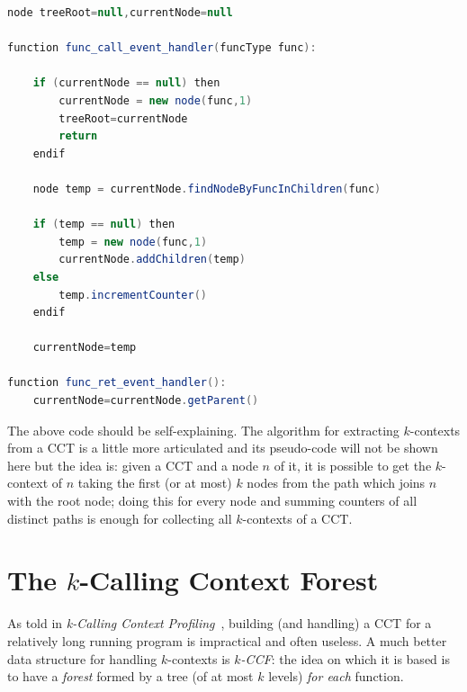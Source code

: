 \documentclass[a4paper,10pt]{report}
\begin{document}
\newpage

\begin{lstlisting}[language=java, label={cct_alg}, caption={An algorithm for building a CCT}, morekeywords={function,then,endif},frame=leftline,framesep=10pt]
node treeRoot=null,currentNode=null

function func_call_event_handler(funcType func):

	if (currentNode == null) then 	
		currentNode = new node(func,1) 
		treeRoot=currentNode
		return
	endif

	node temp = currentNode.findNodeByFuncInChildren(func)

	if (temp == null) then
		temp = new node(func,1)
		currentNode.addChildren(temp)
	else
		temp.incrementCounter()
	endif

	currentNode=temp

function func_ret_event_handler():
	currentNode=currentNode.getParent()

\end{lstlisting}

The above code should be self-explaining.
The algorithm for extracting $k$-contexts from a CCT is a little more articulated 
and its pseudo-code will not be shown here but the idea is: given a CCT and a node $n$ of it, it is possible to get the $k$-context of $n$ taking the first (or at most) $k$ nodes from the path which joins $n$ with the root node; doing this for every node and summing counters of all distinct paths is enough for collecting all $k$-contexts of a CCT.

\section{The $k$-Calling Context Forest}

As told in \emph{k-Calling Context Profiling}~\cite{kccf}, building (and handling) a CCT for a relatively long running program is impractical and often useless.
A much better data structure for handling $k$-contexts is \emph{$k$-CCF}: 
the idea on which it is based is to have a \emph{forest} formed by 
a tree (of at most $k$ levels) \emph{for each} function. 
\end{document}
